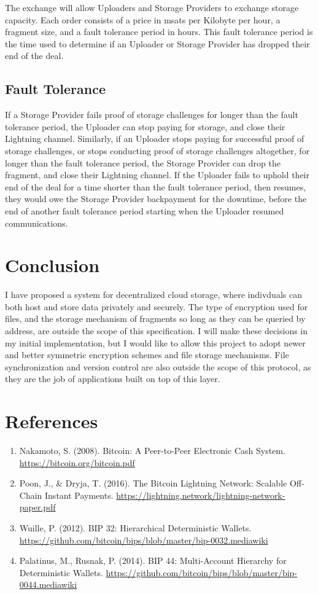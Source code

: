 \documentclass[12pt]{article}
\begin{document}
The exchange will allow Uploaders and Storage Providers to exchange storage capacity. Each order consists of a price in msats per Kilobyte per hour, a fragment size, and a fault tolerance period in hours. This fault tolerance period is the time used to determine if an Uploader or Storage Provider has dropped their end of the deal.

\subsection{Fault Tolerance}
If a Storage Provider fails proof of storage challenges for longer than the fault tolerance period, the Uploader can stop paying for storage, and close their Lightning channel. Similarly, if an Uploader stops paying for successful proof of storage challenges, or stops conducting proof of storage challenges altogether, for longer than the fault tolerance period, the Storage Provider can drop the fragment, and close their Lightning channel. If the Uploader fails to uphold their end of the deal for a time shorter than the fault tolerance period, then resumes, they would owe the Storage Provider backpayment for the downtime, before the end of another fault tolerance period starting when the Uploader resumed communications.

\section{Conclusion}
I have proposed a system for decentralized cloud storage, where indivduals can both host and store data privately and securely. The type of encryption used for files, and the storage mechanism of fragments so long as they can be queried by address, are outside the scope of this specification. I will make these decisions in my initial implementation, but I would like to allow this project to adopt newer and better symmetric encryption schemes and file storage mechanisms. File synchronization and version control are also outside the scope of this protocol, as they are the job of applications built on top of this layer.

\section{References}

\begin{enumerate}
\item Nakamoto, S. (2008). Bitcoin: A Peer-to-Peer Electronic Cash System. \url{https://bitcoin.org/bitcoin.pdf}
\item Poon, J., \& Dryja, T. (2016). The Bitcoin Lightning Network: Scalable Off-Chain Instant Payments. \url{https://lightning.network/lightning-network-paper.pdf}
\item Wuille, P. (2012). BIP 32: Hierarchical Deterministic Wallets. \url{https://github.com/bitcoin/bips/blob/master/bip-0032.mediawiki}
\item Palatinus, M., Rusnak, P. (2014). BIP 44: Multi-Account Hierarchy for Deterministic Wallets. \url{https://github.com/bitcoin/bips/blob/master/bip-0044.mediawiki}
\end{enumerate}
\end{document}
